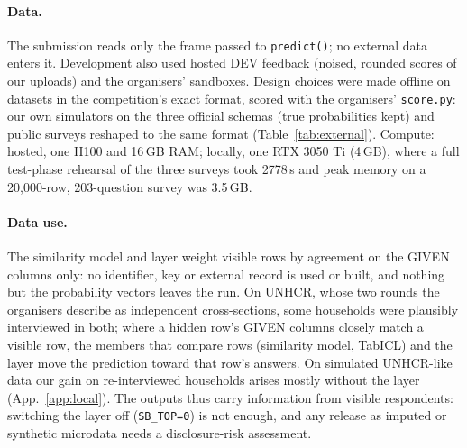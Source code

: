 \documentclass{article}
\begin{document}
\begin{table}[h]
  \centering
  \small
  \caption{Pretrained models. Revision \texttt{4dcd344e\allowbreak ce2c00be\allowbreak 9e831fdd\allowbreak 35bed57b\allowbreak 5ad83e19}, SHA-256 \texttt{bdc7dbd5\allowbreak e4ff21f8\ldots f9b3d4ed0} (full value in the repository).}
  \label{tab:models}
\end{table}

\paragraph{Data.} The submission reads only the frame passed to \texttt{predict()}; no external data enters it. Development also used hosted DEV feedback (noised, rounded scores of our uploads) and the organisers' sandboxes. Design choices were made offline on datasets in the competition's exact format, scored with the organisers' \texttt{score.py}: our own simulators on the three official schemas (true probabilities kept) and public surveys reshaped to the same format (Table~\ref{tab:external}). Compute: hosted, one H100 and 16\,GB RAM; locally, one RTX 3050 Ti (4\,GB), where a full test-phase rehearsal of the three surveys took 2778\,s and peak memory on a 20,000-row, 203-question survey was 3.5\,GB.

\paragraph{Data use.} The similarity model and layer weight visible rows by agreement on the GIVEN columns only: no identifier, key or external record is used or built, and nothing but the probability vectors leaves the run. On UNHCR, whose two rounds the organisers describe as independent cross-sections, some households were plausibly interviewed in both; where a hidden row's GIVEN columns closely match a visible row, the members that compare rows (similarity model, TabICL) and the layer move the prediction toward that row's answers. On simulated UNHCR-like data our gain on re-interviewed households arises mostly without the layer (App.~\ref{app:local}). The outputs thus carry information from visible respondents: switching the layer off (\texttt{SB\_TOP=0}) is not enough, and any release as imputed or synthetic microdata needs a disclosure-risk assessment.
\end{document}
